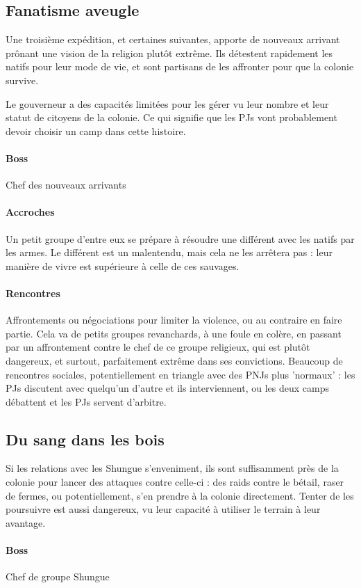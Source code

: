 \documentclass[10pt,a4paper]{book}
\begin{document}
\subsection{Fanatisme aveugle}
Une troisième expédition, et certaines suivantes, apporte de nouveaux arrivant prônant une vision de la religion plutôt extrême. Ils détestent rapidement les natifs pour leur mode de vie, et sont partisans de les affronter pour que la colonie survive.

Le gouverneur a des capacités limitées pour les gérer vu leur nombre et leur statut de citoyens de la colonie. Ce qui signifie que les PJs vont probablement devoir choisir un camp dans cette histoire.
\paragraph{Boss}Chef des nouveaux arrivants
\paragraph{Accroches}Un petit groupe d'entre eux se prépare à résoudre une différent avec les natifs par les armes. Le différent est un malentendu, mais cela ne les arrêtera pas : leur manière de vivre est supérieure à celle de ces sauvages.
\paragraph{Rencontres} Affrontements ou négociations pour limiter la violence, ou au contraire en faire partie. Cela va de petits groupes revanchards, à une foule en colère, en passant par un affrontement contre le chef de ce groupe religieux, qui est plutôt dangereux, et surtout, parfaitement extrême dans ses convictions. Beaucoup de rencontres sociales, potentiellement en triangle avec des PNJs plus 'normaux' : les PJs discutent avec quelqu'un d'autre et ils interviennent, ou les deux camps débattent et les PJs servent d'arbitre. 
\subsection{Du sang dans les bois}
Si les relations avec les Shungue s'enveniment, ils sont suffisamment près de la colonie pour lancer des attaques contre celle-ci : des raids contre le bétail, raser de fermes, ou potentiellement, s'en prendre à la colonie directement. Tenter de les poursuivre est aussi dangereux, vu leur capacité à utiliser le terrain à leur avantage.
\paragraph{Boss} Chef de groupe Shungue
\end{document}
